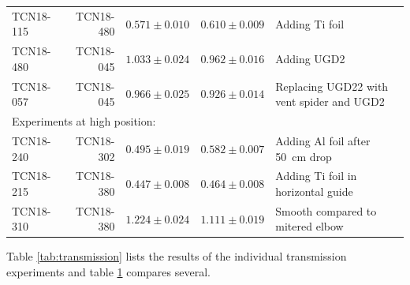 \documentclass[10pt,letterpaper]{article}
\begin{document}
\begin{table}
{\begin{tabular}{l r r r p{}}
TCN18-115 & TCN18-480 & $0.571 \pm 0.010$ & $0.610 \pm 0.009$ & Adding Ti foil \\
TCN18-480 & TCN18-045 & $1.033 \pm 0.024$ & \sout{$0.962 \pm 0.016$} & Adding UGD2 \\
TCN18-057 & TCN18-045 & $0.966 \pm 0.025$ & \sout{$0.926 \pm 0.014$} & Replacing UGD22 with vent spider and UGD2 \\
\midrule
\multicolumn{4}{l}{Experiments at high position:} \\
TCN18-240 & TCN18-302 & $0.495 \pm 0.019$ & $0.582 \pm 0.007$ & Adding Al foil after \SI{50}{\centi\meter} drop \\
TCN18-215 & TCN18-380 & $0.447 \pm 0.008$ & $0.464 \pm 0.008$ & Adding Ti foil in horizontal guide \\
TCN18-310 & TCN18-380 & $1.224 \pm 0.024$ & $1.111 \pm 0.019$ & Smooth compared to mitered elbow\\
\bottomrule
\end{tabular}
}
\label{tab:transmission_comparison}
\end{table}

Table \ref{tab:transmission} lists the results of the individual transmission experiments and table \ref{tab:transmission_comparison} compares several.
\end{document}
